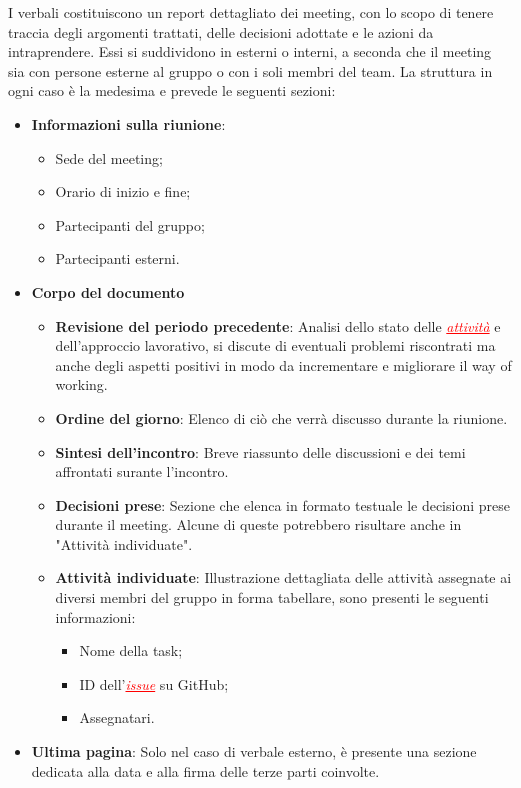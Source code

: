 I verbali costituiscono un report dettagliato dei meeting, con lo scopo di tenere traccia degli argomenti trattati, delle decisioni adottate e le
azioni da intraprendere. Essi si suddividono in esterni o interni, a seconda che il meeting sia con persone esterne al gruppo o con i soli membri del team.
La struttura in ogni caso è la medesima e prevede le seguenti sezioni:
\begin{itemize}
    \item \textbf{Informazioni sulla riunione}:
    \begin{itemize}
        \item Sede del meeting;
        \item Orario di inizio e fine;
        \item Partecipanti del gruppo;
        \item Partecipanti esterni.
    \end{itemize}
    \item \textbf{Corpo del documento}
    \begin{itemize}
        \item \textbf{Revisione del periodo precedente}:
            Analisi dello stato delle \textcolor{red}{\uline{\textit{attività}}} e dell'approccio lavorativo, si discute di eventuali problemi riscontrati
            ma anche degli aspetti positivi in modo da incrementare e migliorare il way of working. 
        \item \textbf{Ordine del giorno}:
            Elenco di ciò che verrà discusso durante la riunione.
        \item \textbf{Sintesi dell'incontro}:
            Breve riassunto delle discussioni e dei temi affrontati surante l'incontro.
        \item \textbf{Decisioni prese}:
            Sezione che elenca in formato testuale le decisioni prese durante il meeting. Alcune di queste potrebbero risultare anche in "Attività individuate".        
        \item \textbf{Attività individuate}:
            Illustrazione dettagliata delle attività assegnate ai diversi membri del gruppo in forma tabellare, sono presenti le seguenti informazioni:
            \begin{itemize}
                \item Nome della task;
                \item ID dell'\textcolor{red}{\uline{\textit{issue}}} su GitHub;
                \item Assegnatari.
            \end{itemize}
    \end{itemize}
    \item \textbf{Ultima pagina}:
    Solo nel caso di verbale esterno, è presente una sezione dedicata alla data e alla firma delle terze parti coinvolte.
\end{itemize}
            
